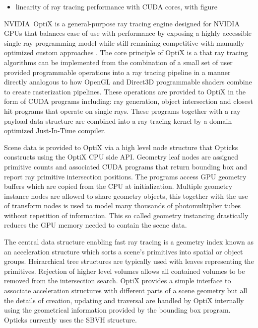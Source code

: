 \documentclass[a4paper]{jpconf}
\begin{document}
\begin{itemize}
\item linearity of ray tracing performance with CUDA cores, with figure
\end{itemize}


NVIDIA\textregistered\ OptiX\texttrademark \cite{optixPaper} \cite{optixSite} 
is a general-purpose ray tracing engine designed for NVIDIA GPUs
that balances ease of use with performance by exposing a highly accessible 
single ray programming model while still remaining competitive with manually 
optimized custom approaches \cite{optixPaper} \cite{understanding}.  
The core principle of OptiX is a that ray tracing algorithms can be implemented 
from the combination of a small set of user provided programmable operations
into a ray tracing pipeline in a manner directly analogous to how OpenGL 
and Direct3D programmable shaders combine to create rasterization pipelines.
These operations are provided to OptiX in the form of CUDA programs \cite{cudaPaper} \cite{cudaURL} 
including: ray generation, object intersection and closest hit programs that operate on 
single rays. These programs together with a ray payload data structure are combined 
into a ray tracing kernel by a domain optimized Just-In-Time compiler.


Scene data is provided to OptiX via a high level node structure that 
Opticks constructs using the OptiX CPU side API. 
Geometry leaf nodes are assigned primitive counts 
and associated CUDA programs that return bounding box and 
report ray primitive intersection positions. 
The programs access GPU geometry buffers which are copied from the CPU at initialization.
Multiple geometry instance nodes are allowed to share geometry objects, this 
together with the use of transform nodes is used to model many thousands of  
photomultiplier tubes without repetition of information. This so called geometry 
instancing drastically reduces the GPU memory needed to contain the scene data.

The central data structure enabling fast ray tracing is a geometry index
known as an acceleration structure which sorts a scene’s primitives 
into spatial or object groups. 
Heirarchical tree structures are typically used
with leaves representing the primitives.  Rejection of higher level
volumes allows all contained volumes to be removed from the intersection
search. OptiX provides a simple interface to associate acceleration structures 
with different parts of a scene geometry but all the details of creation, updating 
and traversal are handled by OptiX internally using the geometrical information provided by the 
bounding box program. Opticks currently uses the SBVH structure\cite{SBVH}.
\end{document}
